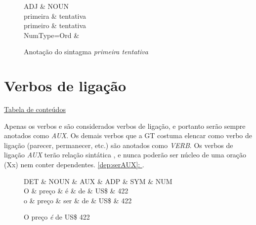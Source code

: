 \documentclass[output=paper,colorlinks,citecolor=brown]{langscibook}
\newcommand*{\fullref}[1]{\hyperref[{#1}]{\autoref*{#1}: \nameref*{#1}}} %
\begin{document}
\begin{figure}[htbp]
    \centering
    \vspace{.8cm}
    \begin{dependency}
    \begin{deptext}
    ADJ \& NOUN \\
    primeira \& tentativa \\
    primeiro \& tentativa \\
    NumType=Ord \& \\
    \end{deptext}
    \end{dependency}
    \caption{Anotação do sintagma \textit{primeira tentativa}}\label{dep:primeiratentativa}
\end{figure}

\section{Verbos de ligação}\label{sec:verbosdeligação}

\hyperlink{toc}{Tabela de conteúdos\\}

Apenas os verbos  e  são considerados verbos de ligação, e portanto serão sempre anotados como \textit{AUX}. Os demais verbos que a GT costuma elencar como verbo de ligação (parecer, permanecer, etc.) são anotados como \textit{VERB}. Os verbos de ligação \textit{AUX} terão relação sintática , e nunca poderão ser núcleo de uma oração (Xx) nem conter dependentes. \fullref{dep:serAUX}.

\begin{figure}[htbp]
    \centering
    \vspace{.8cm}
    \begin{dependency}
    \begin{deptext}
    DET \& NOUN \& AUX \& ADP \& SYM \& NUM \\
    O \& preço \& é \& de \& US\$ \& 422 \\
    o \& preço \& ser \& de \& US\$ \& 422 \\
    \end{deptext}
    \end{dependency}
    \caption{O preço \emph{é} de US\$ 422}\label{dep:serAUX}
\end{figure}
\end{document}
